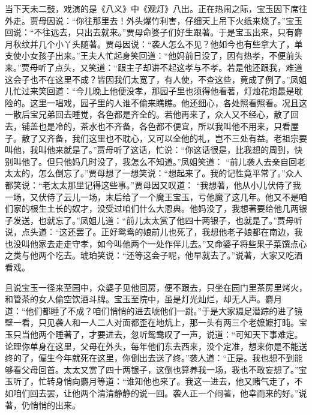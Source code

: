 \begin{parag}


    当下天未二鼓，戏演的是《八义》中《观灯》八出。正在热闹之际，宝玉因下席往外走。贾母因说：“你往那里去！外头爆竹利害，仔细天上吊下火纸来烧了。”宝玉回说：“不往远去，只出去就来。”贾母命婆子们好生跟著。于是宝玉出来，只有麝月秋纹并几个小丫头随著。贾母因说：“袭人怎么不见？他如今也有些拿大了，单支使小女孩子出来。”王夫人忙起身笑回道：“他妈前日没了，因有热孝，不便前头来。”贾母听了点头，又笑道：“跟主子却讲不起这孝与不孝。若是他还跟我，难道这会子也不在这里不成？皆因我们太宽了，有人使，不查这些，竟成了例了。”凤姐儿忙过来笑回道：“今儿晚上他便没孝，那园子里也须得他看著，灯烛花炮最是耽险的。这里一唱戏，园子里的人谁不偷来瞧瞧。他还细心，各处照看照看。况且这一散后宝兄弟回去睡觉，各色都是齐全的。若他再来了，众人又不经心，散了回去，铺盖也是冷的，茶水也不齐备，各色都不便宜，所以我叫他不用来，只看屋子。散了又齐备，我们这里也不耽心，又可以全他的礼，岂不三处有益。老祖宗要叫他，我叫他来就是了。”贾母听了这话，忙说：“你这话很是，比我想的周到，快别叫他了。但只他妈几时没了，我怎么不知道。”凤姐笑道： “前儿袭人去亲自回老太太的，怎么倒忘了。”贾母想了一想笑说：“想起来了。我的记性竟平常了。”众人都笑说：“老太太那里记得这些事。”贾母因又叹道： “我想著，他从小儿伏侍了我一场，又伏侍了云儿一场，末后给了一个魔王宝玉，亏他魔了这几年。他又不是咱们家的根生土长的奴才，没受过咱们什么大恩典。他妈没了，我想著要给他几两银子发送，也就忘了。”凤姐儿道：“前儿太太赏了他四十两银子，也就是了。”贾母听说，点头道：“这还罢了。正好鸳鸯的娘前儿也死了，我想他老子娘都在南边，我也没叫他家去走走守孝，如今叫他两个一处作伴儿去。”又命婆子将些果子菜馔点心之类与他两个吃去。琥珀笑说：“还等这会子呢，他早就去了。”说著，大家又吃酒看戏。
\end{parag}


\begin{parag}


    且说宝玉一径来至园中，众婆子见他回房，便不跟去，只坐在园门里茶房里烤火，和管茶的女人偷空饮酒斗牌。宝玉至院中，虽是灯光灿烂，却无人声。麝月道：“他们都睡了不成？咱们悄悄的进去唬他们一跳。”于是大家蹑足潜踪的进了镜壁一看，只见袭人和一人二人对面都歪在地炕上，那一头有两三个老嬷嬷打盹。宝玉只当他两个睡著了，才要进去，忽听鸳鸯叹了一声，说道：“可知天下事难定。论理你单身在这里，父母在外头，每年他们东去西来，没个定准，想来你是不能送终的了，偏生今年就死在这里，你倒出去送了终。”袭人道：“正是。我也想不到能够看父母回首。太太又赏了四十两银子，这倒也算养我一场，我也不敢妄想了。”宝玉听了，忙转身悄向麝月等道：“谁知他也来了。我这一进去，他又赌气走了，不如咱们回去罢，让他两个清清静静的说一回。袭人正一个闷著，他幸而来的好。”说著，仍悄悄的出来。
\end{parag}


